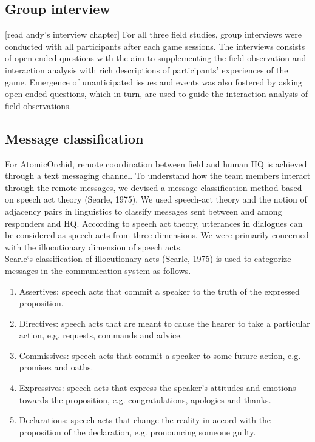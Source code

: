 \subsection{Group interview}
[read andy's interview chapter]
For all three field studies, group interviews were conducted with all participants after each game sessions. The interviews consists of open-ended questions with the aim to supplementing the field observation and interaction analysis with rich descriptions of participants' experiences of the game. Emergence of unanticipated issues and events was also fostered by asking open-ended questions, which in turn, are used to guide the interaction analysis of field observations.\\

\subsection{Message classification} 
For AtomicOrchid, remote coordination between field and human HQ is achieved through a text messaging channel. To understand how the team members interact through the remote messages, we devised a message classification method based on speech act theory (Searle, 1975). We used speech-act theory and the notion of adjacency pairs in linguistics to classify messages sent between and among responders and HQ. According to speech act theory, utterances in dialogues can be considered as speech acts from three dimensions. We were primarily concerned with the illocutionary dimension of speech acts.\\

Searle`s classification of illocutionary acts (Searle, 1975) is used to categorize messages in the communication system as follows.\\

\begin{enumerate}
\item Assertives: speech acts that commit a speaker to the truth of the expressed proposition.
\item Directives: speech acts that are meant to cause the hearer to take a particular action, e.g. requests, commands and advice.
\item Commissives: speech acts that commit a speaker to some future action, e.g. promises and oaths.
\item Expressives: speech acts that express the speaker's attitudes and emotions towards the proposition, e.g. congratulations, apologies and thanks.
\item Declarations: speech acts that change the reality in accord with the proposition of the declaration, e.g. pronouncing someone guilty.
\end{enumerate}

